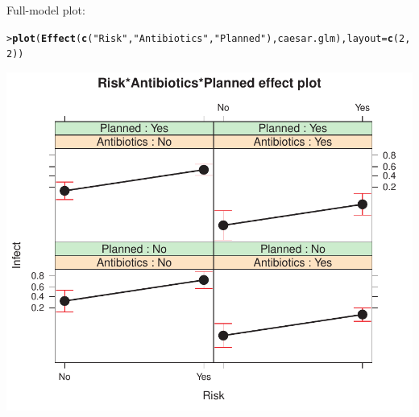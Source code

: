 \documentclass[10pt]{report}\usepackage[]{graphicx}\usepackage[]{color}
\makeatletter
\newcommand{\hlnum}[1]{\textcolor[rgb]{0.686,0.059,0.569}{#1}}%
\newcommand{\hlstr}[1]{\textcolor[rgb]{0.192,0.494,0.8}{#1}}%
\newcommand{\hlstd}[1]{\textcolor[rgb]{0.345,0.345,0.345}{#1}}%
\newcommand{\hlkwc}[1]{\textcolor[rgb]{0.333,0.667,0.333}{#1}}%
\newcommand{\hlkwd}[1]{\textcolor[rgb]{0.737,0.353,0.396}{\textbf{#1}}}%
\newenvironment{kframe}{%
 \def\at@end@of@kframe{}%
 \ifinner\ifhmode%
  \def\at@end@of@kframe{\end{minipage}}%
  \begin{minipage}{\columnwidth}%
 \fi\fi%
 \def\FrameCommand##1{\hskip\@totalleftmargin \hskip-\fboxsep
 \colorbox{shadecolor}{##1}\hskip-\fboxsep
     \hskip-\linewidth \hskip-\@totalleftmargin \hskip\columnwidth}%
 \MakeFramed {\advance\hsize-\width
   \@totalleftmargin\z@ \linewidth\hsize
   \@setminipage}}%
 {\par\unskip\endMakeFramed%
 \at@end@of@kframe}
\newenvironment{knitrout}{}{} %
\renewenvironment{knitrout}{\small\renewcommand{\baselinestretch}{.85}}{} %
\makeatother
\begin{document}
\begin{Exercises}
\begin{enumerate*}
\begin{ans}
\begin{knitrout}
\end{knitrout}
    Full-model plot:
\begin{knitrout}\footnotesize
{}\color{fgcolor}\begin{kframe}
\begin{alltt}
\hlstd{> }\hlkwd{plot}\hlstd{(}\hlkwd{Effect}\hlstd{(}\hlkwd{c}\hlstd{(}\hlstr{"Risk"}\hlstd{,} \hlstr{"Antibiotics"}\hlstd{,} \hlstr{"Planned"}\hlstd{), caesar.glm),} \hlkwc{layout}\hlstd{=}\hlkwd{c}\hlstd{(}\hlnum{2}\hlstd{,}\hlnum{2}\hlstd{))}
\end{alltt}
\end{kframe}

\centerline{\includegraphics[width=.6\textwidth]{soln/fig/ex7_5d2-1} }



\end{knitrout}
    \end{ans}
    
  \end{enumerate*}


\end{Exercises}
\end{document}
